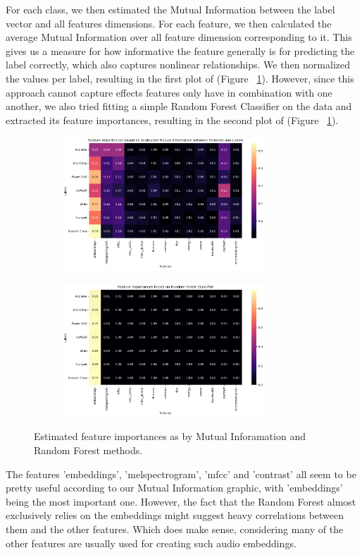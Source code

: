 For each class, we then estimated the Mutual Information between the label vector and all features dimensions. For each feature, we then calculated the average Mutual Information over all feature dimension corresponding to it. This gives us a measure for how informative the feature generally is for predicting the label correctly, which also captures nonlinear relationships. We then normalized the values per label, resulting in the first plot of (Figure ~\ref{fig:1_FI}). However, since this approach cannot capture effects features only have in combination with one another, we also tried fitting a simple Random Forest Classifier on the data and extracted its feature importances, resulting in the second plot of (Figure ~\ref{fig:1_FI}).

\begin{figure}[htbp]
  \centering
  \begin{subfigure}[b]{0.49\textwidth}
    \includegraphics[width=\textwidth, height=5cm]{figs/1_MI.png}
  \end{subfigure}
  \hfill
  \begin{subfigure}[b]{0.49\textwidth}
    \includegraphics[width=\textwidth, height=5cm]{figs/1_RF.png}
  \end{subfigure}
  \caption{Estimated feature importances as by Mutual Inforamation and Random Forest methods.}
  \label{fig:1_FI}
\end{figure}

The features 'embeddings', 'melspectrogram', 'mfcc' and 'contrast' all seem to be pretty useful according to our Mutual Information graphic, with 'embeddings' being the most important one. However, the fact that the Random Forest almost exclusively relies on the embeddings might suggest heavy correlations between them and the other features. Which does make sense, considering many of the other features are usually used for creating such audio embeddings.



